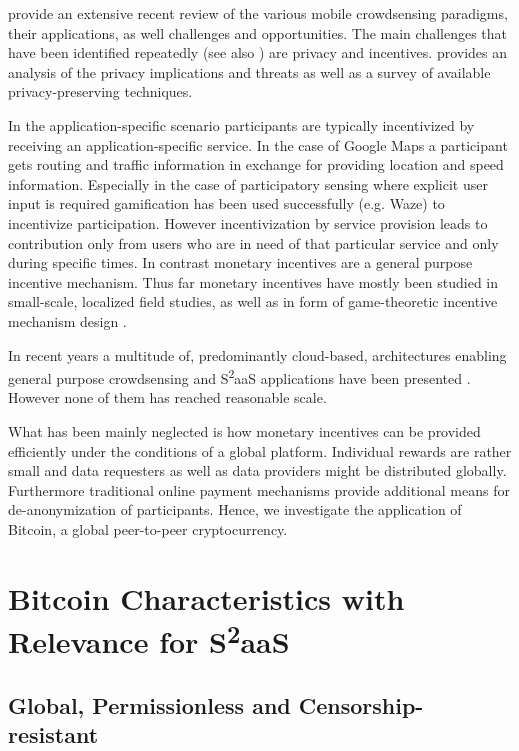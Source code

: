 \cite{guo2015mobile} provide an extensive recent review of the various mobile crowdsensing paradigms, their applications, as well challenges and opportunities. 
The main challenges that have been identified repeatedly (see also \parencite{he2015privacy}) are privacy and incentives. \parencite{Christin2015} provides an analysis of the privacy implications and threats as well as a survey of available privacy-preserving techniques. 

In the application-specific scenario participants are typically incentivized by receiving an application-specific service. In the case of Google Maps a participant gets routing and traffic information in exchange for providing location and speed information. Especially in the case of participatory sensing where explicit user input is required gamification \parencite{Deterding:2011:GDE:2181037.2181040} has been used successfully (e.g. Waze) to incentivize participation. However incentivization by service provision leads to contribution only from users who are in need of that particular service and only during specific times. In contrast monetary incentives are a general purpose incentive mechanism. Thus far monetary incentives have mostly been studied in small-scale, localized field studies, as well as in form of game-theoretic incentive mechanism design \parencite{7101300}. 

In recent years a multitude of, predominantly cloud-based, architectures enabling general purpose crowdsensing and S\textsuperscript{2}aaS applications have been presented \parencite{6558754,6525603,giannotti2012planetary,Haderer2015,merlino2016mobile}. However none of them has reached reasonable scale.

What has been mainly neglected is how monetary incentives can be provided efficiently under the conditions of a global platform. 
Individual rewards are rather small and data requesters as well as data providers might be distributed globally. Furthermore traditional online payment mechanisms provide additional means for de-anonymization of participants.
Hence, we investigate the application of Bitcoin, a global peer-to-peer cryptocurrency.


\section{Bitcoin Characteristics with Relevance for S\textsuperscript{2}aaS}
\label{sec:s2aas_charac}

\subsection{Global, Permissionless and Censorship-resistant}

